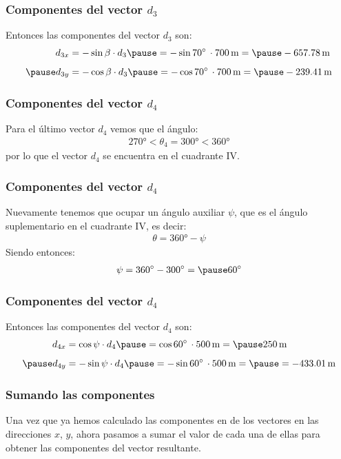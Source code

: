 \documentclass[12pt]{beamer}
\begin{document}
\begin{frame}
\frametitle{Componentes del vector $d_{3}$}
Entonces las componentes del vector $d_{3}$ son:
\pause
\begin{eqnarray*}
\begin{aligned}
d_{3x} &= -\sin \beta \cdot d_{3} \pause = -\sin \ang{70} \, \cdot \SI{700}{\meter} = \pause -\SI{657.78}{\meter} \\[0.5em] \pause
d_{3y} &= -\cos \beta \cdot d_{3} \pause = -\cos \ang{70} \, \cdot \SI{700}{\meter} = \pause -\SI{239.41}{\meter}
\end{aligned}
\end{eqnarray*}
\end{frame}
\begin{frame}
\frametitle{Componentes del vector $d_{4}$}
Para el último vector $d_{4}$ vemos que el ángulo:
\pause
\begin{eqnarray*}
\ang{270} < \theta_{4} = \ang{300} < \ang{360}
\end{eqnarray*}
\pause
por lo que el vector $d_{4}$ se encuentra en el cuadrante IV.
\end{frame}
\begin{frame}
\frametitle{Componentes del vector $d_{4}$}
Nuevamente tenemos que ocupar un ángulo auxiliar $\psi$, que es el ángulo suplementario en el cuadrante IV, es decir:
\pause
\begin{align*}
\theta = \ang{360} - \psi
\end{align*}
\pause
Siendo entonces:
\pause
\begin{eqnarray*}
\psi = \ang{360} - \ang{300} = \pause \ang{60}
\end{eqnarray*}
\end{frame}
\begin{frame}
\frametitle{Componentes del vector $d_{4}$}
Entonces las componentes del vector $d_{4}$ son:
\pause
\begin{eqnarray*}
\begin{aligned}
d_{4x} &= \cos \psi \cdot d_{4} \pause = \cos \ang{60} \, \cdot \SI{500}{\meter} = \pause \SI{250}{\meter} \\[0.5em] \pause
d_{4y} &= -\sin \psi \cdot d_{4} \pause = - \sin \ang{60} \, \cdot \SI{500}{\meter} = \pause = -\SI{433.01}{\meter}
\end{aligned}
\end{eqnarray*}
\end{frame}
\begin{frame}
\frametitle{Sumando las componentes}
Una vez que ya hemos calculado las componentes en de los vectores en las direcciones $x$, $y$, ahora pasamos a sumar el valor de cada una de ellas para obtener las componentes del vector resultante.
\end{frame}
\end{document}
